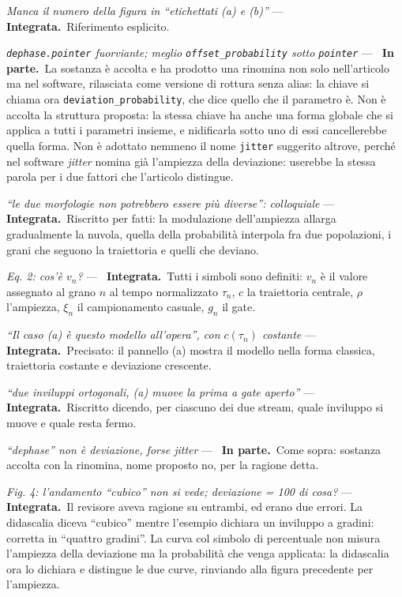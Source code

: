 \documentclass[11pt,a4paper]{article}
\newcommand{\integrata}{\textbf{Integrata.}}
\newcommand{\parziale}{\textbf{In parte.}}
\newenvironment{rilievi}
  {\begin{list}{}{%
    \setlength{\leftmargin}{1.6em}\setlength{\itemindent}{-1.6em}%
    \setlength{\itemsep}{4pt}\setlength{\parsep}{0pt}\setlength{\topsep}{4pt}}}
  {\end{list}}
\newcommand{\voce}[1]{\item \textit{#1} ---\ }
\begin{document}
\begin{rilievi}
\voce{Manca il numero della figura in ``etichettati (a) e (b)''}
\integrata\ Riferimento esplicito.

\voce{\texttt{dephase.pointer} fuorviante; meglio
\texttt{offset\_probability} sotto \texttt{pointer}} \parziale\ La sostanza
è accolta e ha prodotto una rinomina non solo nell'articolo ma nel software,
rilasciata come versione di rottura senza alias: la chiave si chiama ora
\texttt{deviation\_probability}, che dice quello che il parametro è. Non è
accolta la struttura proposta: la stessa chiave ha anche una forma globale
che si applica a tutti i parametri insieme, e nidificarla sotto uno di essi
cancellerebbe quella forma. Non è adottato nemmeno il nome \texttt{jitter}
suggerito altrove, perché nel software \emph{jitter} nomina già l'ampiezza
della deviazione: userebbe la stessa parola per i due fattori che
l'articolo distingue.

\voce{``le due morfologie non potrebbero essere più diverse'': colloquiale}
\integrata\ Riscritto per fatti: la modulazione dell'ampiezza allarga
gradualmente la nuvola, quella della probabilità interpola fra due
popolazioni, i grani che seguono la traiettoria e quelli che deviano.

\voce{Eq. 2: cos'è $v_n$?} \integrata\ Tutti i simboli sono definiti: $v_n$
è il valore assegnato al grano $n$ al tempo normalizzato $\tau_n$, $c$ la
traiettoria centrale, $\rho$ l'ampiezza, $\xi_n$ il campionamento casuale,
$g_n$ il gate.

\voce{``Il caso (a) è questo modello all'opera'', con $c(\tau_n)$ costante}
\integrata\ Precisato: il pannello (a) mostra il modello nella forma
classica, traiettoria costante e deviazione crescente.

\voce{``due inviluppi ortogonali, (a) muove la prima a gate aperto''}
\integrata\ Riscritto dicendo, per ciascuno dei due stream, quale inviluppo
si muove e quale resta fermo.

\voce{``dephase'' non è deviazione, forse \emph{jitter}} \parziale\ Come
sopra: sostanza accolta con la rinomina, nome proposto no, per la ragione
detta.

\voce{Fig. 4: l'andamento ``cubico'' non si vede; deviazione = 100 di cosa?}
\integrata\ Il revisore aveva ragione su entrambi, ed erano due errori. La
didascalia diceva ``cubico'' mentre l'esempio dichiara un inviluppo a
gradini: corretta in ``quattro gradini''. La curva col simbolo di
percentuale non misura l'ampiezza della deviazione ma la probabilità che
venga applicata: la didascalia ora lo dichiara e distingue le due curve,
rinviando alla figura precedente per l'ampiezza.


\end{rilievi}
\end{document}
